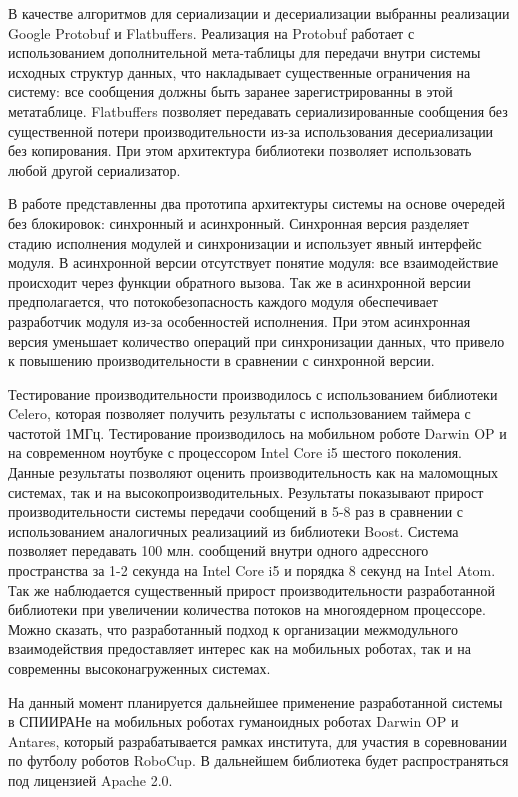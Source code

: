 В качестве алгоритмов для сериализации и десериализации выбранны реализации Google Protobuf и Flatbuffers. Реализация на Protobuf работает с использованием дополнительной мета-таблицы для передачи внутри системы исходных структур данных, что накладывает существенные ограничения на систему: все сообщения должны быть заранее зарегистрированны в этой метатаблице. Flatbuffers позволяет передавать сериализированные сообщения без существенной потери производительности из-за использования десериализации без копирования. При этом архитектура библиотеки позволяет использовать любой другой сериализатор.

В работе представленны два прототипа архитектуры системы на основе очередей без блокировок: синхронный и асинхронный. Синхронная версия разделяет стадию исполнения модулей и синхронизации и использует явный интерфейс модуля. В асинхронной версии отсутствует понятие модуля: все взаимодействие происходит через функции обратного вызова. Так же в асинхронной версии предполагается, что потокобезопасность каждого модуля обеспечивает разработчик модуля из-за особенностей исполнения. При этом асинхронная версия уменьшает количество операций при синхронизации данных, что привело к повышению производительности в сравнении с синхронной версии.

Тестирование производительности производилось с использованием библиотеки Celero, которая позволяет получить результаты с использованием таймера с частотой 1МГц. Тестирование производилось на мобильном роботе Darwin OP и на современном ноутбуке с процессором Intel Core i5 шестого поколения. Данные результаты позволяют оценить производительность как на маломощных системах, так и на высокопроизводительных. Результаты показывают прирост производительности системы передачи сообщений в 5-8 раз в сравнении с использованием аналогичных реализациий из библиотеки Boost. Система позволяет передавать 100 млн. сообщений внутри одного адрессного пространства за 1-2 секунда на Intel Core i5 и порядка 8 секунд на Intel Atom. Так же наблюдается существенный прирост производительности разработанной библиотеки при увеличении количества потоков на многоядерном процессоре. Можно сказать, что разработанный подход к организации межмодульного взаимодействия предоставляет интерес как на мобильных роботах, так и на современны высоконагруженных системах.

На данный момент планируется дальнейшее применение разработанной системы в СПИИРАНе на мобильных роботах гуманоидных роботах Darwin OP и Antares, который разрабатывается рамках института, для участия в соревновании по футболу роботов RoboCup. В дальнейшем библиотека будет распространяться под лицензией Apache 2.0.